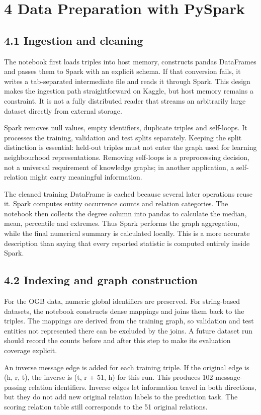 \documentclass[11pt]{article}
\begin{document}
\section*{4 Data Preparation with PySpark}
\subsection*{4.1 Ingestion and cleaning}
The notebook first loads triples into host memory, constructs pandas DataFrames and passes them to Spark with an explicit schema. If that conversion fails, it writes a tab-separated intermediate file and reads it through Spark. This design makes the ingestion path straightforward on Kaggle, but host memory remains a constraint. It is not a fully distributed reader that streams an arbitrarily large dataset directly from external storage.

Spark removes null values, empty identifiers, duplicate triples and self-loops. It processes the training, validation and test splits separately. Keeping the split distinction is essential: held-out triples must not enter the graph used for learning neighbourhood representations. Removing self-loops is a preprocessing decision, not a universal requirement of knowledge graphs; in another application, a self-relation might carry meaningful information.

The cleaned training DataFrame is cached because several later operations reuse it. Spark computes entity occurrence counts and relation categories. The notebook then collects the degree column into pandas to calculate the median, mean, percentile and extremes. Thus Spark performs the graph aggregation, while the final numerical summary is calculated locally. This is a more accurate description than saying that every reported statistic is computed entirely inside Spark.

\subsection*{4.2 Indexing and graph construction}
For the OGB data, numeric global identifiers are preserved. For string-based datasets, the notebook constructs dense mappings and joins them back to the triples. The mappings are derived from the training graph, so validation and test entities not represented there can be excluded by the joins. A future dataset run should record the counts before and after this step to make its evaluation coverage explicit.

An inverse message edge is added for each training triple. If the original edge is (h, r, t), the inverse is (t, r + 51, h) for this run. This produces 102 message-passing relation identifiers. Inverse edges let information travel in both directions, but they do not add new original relation labels to the prediction task. The scoring relation table still corresponds to the 51 original relations.
\end{document}
